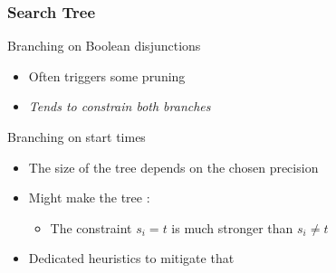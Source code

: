 \begin{frame}
\frametitle{Search Tree}

\vfill

\begin{myblock}{Branching on Boolean disjunctions}

\begin{itemize}
  \item Often triggers some pruning

  \vfill\pause
  \item \emph{Tends to constrain both branches}
\end{itemize}

\end{myblock}

\vfill\pause

\begin{myblock}{Branching on start times}

\begin{itemize}
  \item The size of the tree depends on the chosen precision 

  \vfill\pause


  \item Might make the tree :

  \vfill
  \begin{itemize}
    \item The constraint $s_i = t$ is much stronger than  $s_i \neq t$
  \end{itemize}

  \vfill\pause
  \item Dedicated heuristics to mitigate that

\end{itemize}

\end{myblock}

\vfill

\end{frame}



